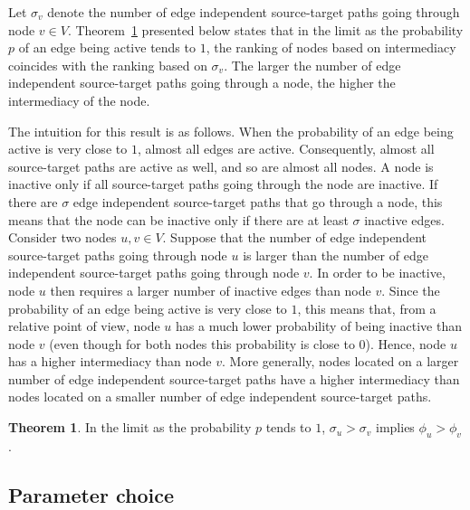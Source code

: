 \documentclass[9pt,twocolumn,twoside,lineno]{pnas-alt}
\theoremstyle{definition}
\newtheorem{theorem}{Theorem}
\newcommand{\theref}[1]{Theorem~\ref{the:#1}\xspace}
\begin{document}
Let $\sigma_v$ denote the number of edge independent source-target paths going through node $v \in V$. \theref{p1} presented below states that in the limit as the probability $p$ of an edge being active tends to $1$, the ranking of nodes based on intermediacy coincides with the ranking based on $\sigma_v$. The larger the number of edge independent source-target paths going through a node, the higher the intermediacy of the node.

The intuition for this result is as follows. When the probability of an edge being active is very close to $1$, almost all edges are active. Consequently, almost all source-target paths are active as well, and so are almost all nodes. A node is inactive only if all source-target paths going through the node are inactive. If there are $\sigma$ edge independent source-target paths that go through a node, this means that the node can be inactive only if there are at least $\sigma$ inactive edges. Consider two nodes $u, v \in V$. Suppose that the number of edge independent source-target paths going through node $u$ is larger than the number of edge independent source-target paths going through node $v$. In order to be inactive, node $u$ then requires a larger number of inactive edges than node $v$. Since the probability of an edge being active is very close to $1$, this means that, from a relative point of view, node $u$ has a much lower probability of being inactive than node $v$ (even though for both nodes this probability is close to $0$). Hence, node $u$ has a higher intermediacy than node $v$. More generally, nodes located on a larger number of edge independent source-target paths have a higher intermediacy than nodes located on a smaller number of edge independent source-target paths.

\begin{theorem}
    In the limit as the probability $p$ tends to $1$, $\sigma_u > \sigma_v$ implies $\phi_u > \phi_v$.
    \label{the:p1}
\end{theorem}

%
%

\subsection*{\label{sec:param}Parameter choice}
\end{document}
